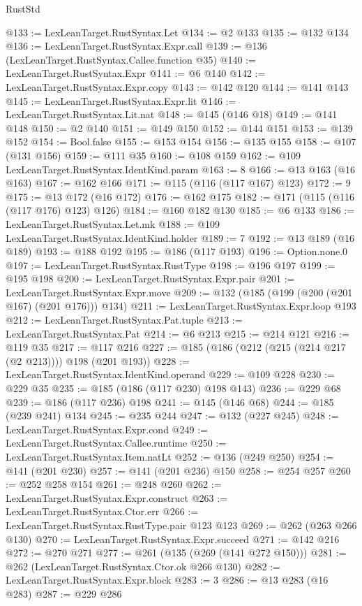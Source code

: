 \begin{lexlean}{RustStd}
\begin{coremodule}
@133 := LexLeanTarget.RustSyntax.Let
@134 := @2 @133
@135 := @132 @134
@136 := LexLeanTarget.RustSyntax.Expr.call
@139 := @136 (LexLeanTarget.RustSyntax.Callee.function @35)
@140 := LexLeanTarget.RustSyntax.Expr
@141 := @6 @140
@142 := LexLeanTarget.RustSyntax.Expr.copy
@143 := @142 @120
@144 := @141 @143
@145 := LexLeanTarget.RustSyntax.Expr.lit
@146 := LexLeanTarget.RustSyntax.Lit.nat
@148 := @145 (@146 @18)
@149 := @141 @148
@150 := @2 @140
@151 := @149 @150
@152 := @144 @151
@153 := @139 @152
@154 := Bool.false
@155 := @153 @154
@156 := @135 @155
@158 := @107 (@131 @156)
@159 := @111 @35
@160 := @108 @159
@162 := @109 LexLeanTarget.RustSyntax.IdentKind.param
@163 := 8
@166 := @13 @163 (@16 @163)
@167 := @162 @166
@171 := @115 (@116 (@117 @167) @123)
@172 := 9
@175 := @13 @172 (@16 @172)
@176 := @162 @175
@182 := @171 (@115 (@116 (@117 @176) @123) @126)
@184 := @160 @182 @130
@185 := @6 @133
@186 := LexLeanTarget.RustSyntax.Let.mk
@188 := @109 LexLeanTarget.RustSyntax.IdentKind.holder
@189 := 7
@192 := @13 @189 (@16 @189)
@193 := @188 @192
@195 := @186 (@117 @193)
@196 := Option.none.{0}
@197 := LexLeanTarget.RustSyntax.RustType
@198 := @196 @197
@199 := @195 @198
@200 := LexLeanTarget.RustSyntax.Expr.pair
@201 := LexLeanTarget.RustSyntax.Expr.move
@209 := @132 (@185 (@199 (@200 (@201 @167) (@201 @176))) @134)
@211 := LexLeanTarget.RustSyntax.Expr.loop @193
@212 := LexLeanTarget.RustSyntax.Pat.tuple
@213 := LexLeanTarget.RustSyntax.Pat
@214 := @6 @213
@215 := @214 @121
@216 := @119 @35
@217 := @117 @216
@227 := @185 (@186 (@212 (@215 (@214 @217 (@2 @213)))) @198 (@201 @193))
@228 := LexLeanTarget.RustSyntax.IdentKind.operand
@229 := @109 @228
@230 := @229 @35
@235 := @185 (@186 (@117 @230) @198 @143)
@236 := @229 @68
@239 := @186 (@117 @236) @198
@241 := @145 (@146 @68)
@244 := @185 (@239 @241) @134
@245 := @235 @244
@247 := @132 (@227 @245)
@248 := LexLeanTarget.RustSyntax.Expr.cond
@249 := LexLeanTarget.RustSyntax.Callee.runtime
@250 := LexLeanTarget.RustSyntax.Item.natLt
@252 := @136 (@249 @250)
@254 := @141 (@201 @230)
@257 := @141 (@201 @236) @150
@258 := @254 @257
@260 := @252 @258 @154
@261 := @248 @260
@262 := LexLeanTarget.RustSyntax.Expr.construct
@263 := LexLeanTarget.RustSyntax.Ctor.err
@266 := LexLeanTarget.RustSyntax.RustType.pair @123 @123
@269 := @262 (@263 @266 @130)
@270 := LexLeanTarget.RustSyntax.Expr.succeed
@271 := @142 @216
@272 := @270 @271
@277 := @261 (@135 (@269 (@141 @272 @150)))
@281 := @262 (LexLeanTarget.RustSyntax.Ctor.ok @266 @130)
@282 := LexLeanTarget.RustSyntax.Expr.block
@283 := 3
@286 := @13 @283 (@16 @283)
@287 := @229 @286

\end{coremodule}
\end{lexlean}
